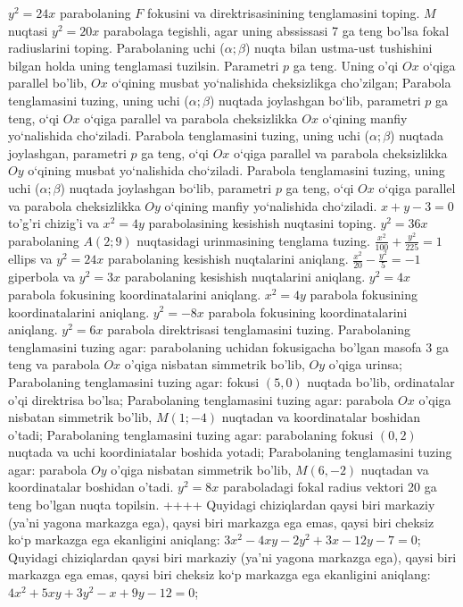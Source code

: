 $y^2=24 x$ parabolaning $F$ fokusini va direktrisasinining tenglamasini toping.
$M$ nuqtasi $y^2=20 x$ parabolaga tegishli, agar uning abssissasi 7 ga teng bo'lsa fokal radiuslarini toping.
Parabolaning uchi ($\alpha;\beta$) nuqta bilan ustma-ust tushishini bilgan holda uning tenglamasi tuzilsin. Parametri $p$ ga teng. Uning o'qi $O x$ o‘qiga parallel bo'lib, $O x$ o‘qining musbat yo‘nalishida cheksizlikga cho'zilgan;
Parabola tenglamasini tuzing, uning uchi ($\alpha; \beta$) nuqtada joylashgan bo‘lib, parametri $p$ ga teng, o‘qi $Ox$ o‘qiga parallel va parabola cheksizlikka $Ox$ o‘qining manfiy yo‘nalishida cho‘ziladi.
Parabola tenglamasini tuzing, uning uchi ($\alpha; \beta$) nuqtada joylashgan, parametri $p$ ga teng, o‘qi $Ox$ o‘qiga parallel va parabola cheksizlikka $Oy$ o‘qining musbat yo‘nalishida cho‘ziladi.
Parabola tenglamasini tuzing, uning uchi ($\alpha; \beta$) nuqtada joylashgan bo‘lib, parametri $p$ ga teng, o‘qi $Ox$ o‘qiga parallel va parabola cheksizlikka $Oy$ o‘qining manfiy yo‘nalishida cho‘ziladi.
$x+y-3=0$ to'g'ri chizig'i va $x^2=4 y$ parabolasining kesishish nuqtasini toping.
$y^2=36 x$ parabolaning $A(2 ; 9)$ nuqtasidagi urinmasining tenglama tuzing.
$\frac{x^2}{100}+\frac{y^2}{225}=1$ ellips va $y^2=24 x$ parabolaning kesishish nuqtalarini aniqlang.
$\frac{x^2}{20}-\frac{y^2}{5}=-1$ giperbola va $y^2=3 x$ parabolaning kesishish nuqtalarini aniqlang.
$y^2=4 x$ parabola fokusining koordinatalarini aniqlang.
$x^2=4 y$ parabola fokusining koordinatalarini aniqlang.
$y^2=-8 x$ parabola fokusining koordinatalarini aniqlang.
$y^2=6 x$ parabola direktrisasi tenglamasini tuzing.
Parabolaning tenglamasini tuzing agar: parabolaning uchidan fokusigacha bo'lgan masofa 3 ga teng va parabola $O x$ o'qiga nisbatan simmetrik bo'lib, $O y$ o'qiga urinsa;
Parabolaning tenglamasini tuzing agar: fokusi $(5,0)$ nuqtada bo'lib, ordinatalar o'qi direktrisa bo'lsa;
Parabolaning tenglamasini tuzing agar: parabola $O x$ o'qiga nisbatan simmetrik bo'lib, $M(1 ;-4)$ nuqtadan va koordinatalar boshidan o'tadi;
Parabolaning tenglamasini tuzing agar: parabolaning fokusi $(0,2)$ nuqtada va uchi koordiniatalar boshida yotadi;
Parabolaning tenglamasini tuzing agar: parabola $O y$ o'qiga nisbatan simmetrik bo'lib, $M(6,-2)$ nuqtadan va koordinatalar boshidan o'tadi.
$y^2=8 x$ paraboladagi fokal radius vektori 20 ga teng bo'lgan nuqta topilsin.
++++
Quyidagi chiziqlardan qaysi biri markaziy (ya’ni yagona markazga ega), qaysi biri markazga ega emas, qaysi biri cheksiz ko‘p markazga ega ekanligini aniqlang: $3 x^2-4 x y-2 y^2+3 x-12 y-7=0$;
Quyidagi chiziqlardan qaysi biri markaziy (ya’ni yagona markazga ega), qaysi biri markazga ega emas, qaysi biri cheksiz ko‘p markazga ega ekanligini aniqlang: $4 x^2+5 x y+3 y^2-x+9 y-12=0$;
